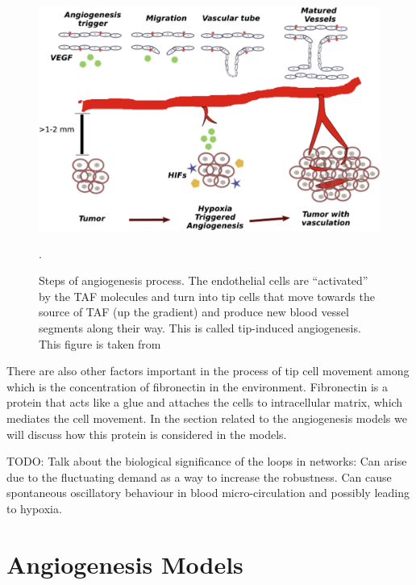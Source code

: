 \documentclass[10pt,a4paper,twocolumn]{article}
\begin{document}
	\begin{figure}[h!]
		\centering
		\includegraphics[width=1\linewidth]{images/Angiogenesis}
		\caption{Steps of angiogenesis process. The endothelial cells are ``activated'' by the TAF molecules and turn into tip cells that move towards the source of TAF (up the gradient) and produce new blood vessel segments along their way. This is called tip-induced angiogenesis. This figure is taken from \cite{Atale2020}}.
		\label{fig:angiogenesis}
	\end{figure}
	\FloatBarrier
	
	There are also other factors important in the process of tip cell movement among which is the concentration of fibronectin in the environment. Fibronectin is a protein that acts like a glue and attaches the cells to intracellular matrix, which mediates the cell movement. In the section related to the angiogenesis models we will discuss how this protein is considered in the models.
	
	{\color{red} \noindent TODO: Talk about the biological significance of the loops in networks: Can arise due to the fluctuating demand as a way to increase the robustness. Can cause spontaneous oscillatory behaviour in blood micro-circulation and possibly leading to hypoxia.}
	
	\section{Angiogenesis Models}
\end{document}
